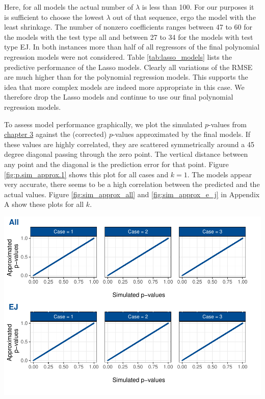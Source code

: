 \documentclass[12pt,a4paper]{article}
\let\origfigure\figure
\let\endorigfigure\endfigure
\renewenvironment{figure}[1][2] {
    \expandafter\origfigure\expandafter[H]
} {
    \endorigfigure
}
\begin{document}
Here, for all models the actual number of \(\lambda\) is less than 100.
For our purposes it is sufficient to choose the lowest \(\lambda\) out
of that sequence, ergo the model with the least shrinkage. The number of
nonzero coefficients ranges between 47 to 60 for the models with the
test type all and between 27 to 34 for the models with test type EJ. In
both instances more than half of all regressors of the final polynomial
regression models were not considered. Table \ref{tab:lasso_models}
lists the predictive performance of the \ac{Lasso} models. Clearly all
variations of the RMSE are much higher than for the polynomial
regression models. This supports the idea that more complex models are
indeed more appropriate in this case. We therefore drop the \ac{Lasso}
models and continue to use our final polynomial regression models.

To assess model performance graphically, we plot the simulated
\(p\)-values from \protect\hyperlink{simulation}{chapter 3} against the
(corrected) \(p\)-values approximated by the final models. If these
values are highly correlated, they are scattered symmetrically around a
45 degree diagonal passing through the zero point. The vertical distance
between any point and the diagonal is the prediction error for that
point. Figure \ref{fig:p.sim_approx.1} shows this plot for all cases and
\(k = 1\). The models appear very accurate, there seems to be a high
correlation between the predicted and the actual values. Figure
\ref{fig:sim_approx_all} and \ref{fig:sim_approx_e_j} in Appendix A show
these plots for all \(k\).

\begin{figure}
\centering
\includegraphics{p_approx_paper_files/figure-latex/p.sim_aprox.k1-1.pdf}
\caption{\label{fig:p.sim_approx.1} Simulated \(p\)-values plotted
against \(p\)-values approximated by final (corrected) models, exemplary
for \(k = 1\).}
\end{figure}
\end{document}

